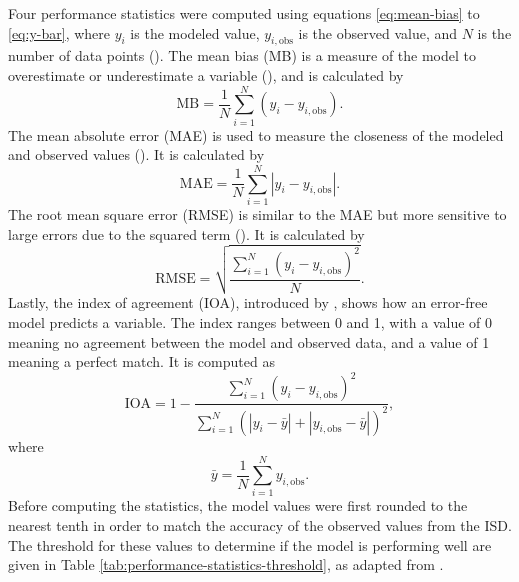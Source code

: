 		Four performance statistics were computed using equations \ref{eq:mean-bias} to \ref{eq:y-bar},
			where $y_i$ is the modeled value, $y_{i,\text{obs}}$ is the observed value, and $N$ is the number of data points (\cite{Bilang2022}).
		The mean bias (MB) is a measure of the model to overestimate or underestimate a variable (\cite{Carbonell2013}), and is calculated by
		\begin{equation}
			\text{MB} =
				\frac{1}{N}
				\sum_{i=1}^{N}
				(y_i - y_{i,\text{obs}}).
				\label{eq:mean-bias}
		\end{equation}
		The mean absolute error (MAE) is used to measure the closeness of the modeled and observed values (\cite{Arasa2016}).
		It is calculated by
		\begin{equation}
			\text{MAE} =
				\frac{1}{N}
				\sum_{i=1}^{N} 
				|y_i - y_{i,\text{obs}}|. \label{eq:mean-absolute-error}
		\end{equation}
		The root mean square error (RMSE) is similar to the MAE but more sensitive to large errors due to the squared term (\cite{Carbonell2013}).
		It is calculated by
		\begin{equation}
			\text{RMSE} =
			\sqrt{
				\frac{
					\sum_{i=1}^{N}
					(y_i - y_{i,\text{obs}}) ^ 2
				}{N}
			}.
			\label{eq:root-mean-square-error}
		\end{equation}
		Lastly, the index of agreement (IOA), introduced by \textcite{Willmott1980}, shows how an error-free model predicts a variable.
		The index ranges between \num{0} and \num{1},
			with a value of \num{0} meaning no agreement between the model and observed data,
			and a value of \num{1} meaning a perfect match. 
		It is computed as
		\begin{equation}
			\text{IOA} =
				1 - 
				\frac{
					\sum_{i=1}^{N}
					(y_i - y_{i,\text{obs}}) ^ 2
				}{
					\sum_{i=1}^{N} (
						|y_i - \bar{y}| +
						|y_{i,\text{obs}} - \bar{y}|
					)^2
				},
				\label{eq:index-of-agreement}
		\end{equation}
		where
		\begin{equation}
			\bar{y} = 
				\frac{1}{N}
				\sum_{i=1}^{N} y_{i,\text{obs}}.
				\label{eq:y-bar}
		\end{equation}
		Before computing the statistics, the model values were first rounded to the nearest tenth in order to match the accuracy of the observed values from the ISD.
		The threshold for these values to determine if the model is performing well are given in Table \ref{tab:performance-statistics-threshold}, as adapted from \textcite{Bilang2022}.
	
